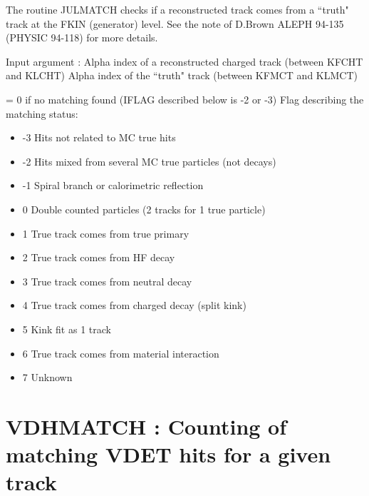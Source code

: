  
     The routine JULMATCH checks if a reconstructed track comes from a
     ``truth" track at the FKIN (generator) level.
                             See the note of D.Brown ALEPH 94-135 (PHYSIC 94-118) for more details.
 
 
\begin{indentlist}{ 3.50cm}{ 3.75cm}
      Input argument :   Alpha index of a reconstructed charged track (between KFCHT and KLCHT)
      Alpha index of the ``truth"  track (between KFMCT and KLMCT)
 
                         = 0 if no matching found (IFLAG described below is -2 or -3)
   Flag describing the matching status:
 
\begin{itemize}
\item                         -3    Hits not related to MC true hits
\item                         -2    Hits mixed from several MC true particles (not decays)
\item                         -1    Spiral branch or calorimetric reflection
\item                          0    Double counted particles (2 tracks for 1 true particle)
\item                          1    True track comes from true primary
\item                          2    True track comes from HF decay
\item                          3    True track comes from neutral decay
\item                          4    True track comes from charged decay (split kink)
\item                          5    Kink fit as 1 track
\item                          6    True track comes from material interaction
\item                          7    Unknown
\end{itemize}
\end{indentlist}
 
\par
\section{\label{sec-OAVDHMAT}VDHMATCH : Counting of matching VDET hits for a given track}
\par
{}
\par
 
